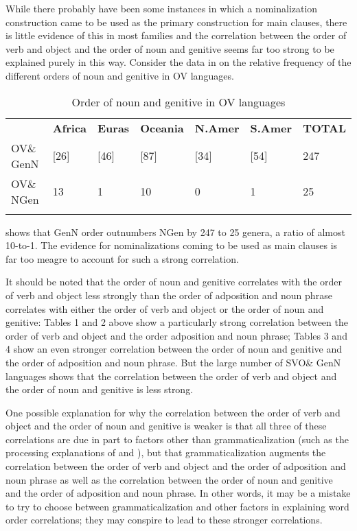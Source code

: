 \documentclass[output=paper]{langsci/langscibook}
\begin{document}
While there probably have been some instances in which a nominalization construction came to be used as the primary construction for main clauses, there is little evidence of this in most families and the correlation between the order of verb and object and the order of noun and genitive seems far too strong to be explained purely in this way. Consider the data in  on the relative frequency of the different orders of noun and genitive in OV languages.

\begin{table}
\begin{tabularx}{\textwidth}{XXXXXXX}
\lsptoprule
& \bfseries Africa & \bfseries Euras & \bfseries Oceania & \bfseries N.Amer & \bfseries S.Amer & \bfseries TOTAL\\
OV\& GenN & [26] & [46] & [87] & [34] & [54] & 247\\
OV\& NGen & 13 & 1 & 10 & 0 & 1 & 25\\
\lspbottomrule
\end{tabularx}
\caption{\label{tab:dryer:7}Order of noun and genitive in OV languages}
\end{table}

 shows that GenN order outnumbers NGen by 247 to 25 genera, a ratio of almost 10-to-1. The evidence for nominalizations coming to be used as main clauses is far too meagre to account for such a strong correlation.

It should be noted that the order of noun and genitive correlates with the order of verb and object less strongly than the order of adposition and noun phrase correlates with either the order of verb and object or the order of noun and genitive: Tables 1 and 2 above show a particularly strong correlation between the order of verb and object and the order adposition and noun phrase; Tables 3 and 4 show an even stronger correlation between the order of noun and genitive and the order of adposition and noun phrase. But the large number of SVO\& GenN languages shows that the correlation between the order of verb and object and the order of noun and genitive is less strong.

One possible explanation for why the correlation between the order of verb and object and the order of noun and genitive is weaker is that all three of these correlations are due in part to factors other than grammaticalization (such as the processing explanations of \citealt{Dryer1992} and \citealt{Hawkins1994,Hawkins2004,Hawkins2014}), but that grammaticalization augments the correlation between the order of verb and object and the order of adposition and noun phrase as well as the correlation between the order of noun and genitive and the order of adposition and noun phrase. In other words, it may be a mistake to try to choose between grammaticalization and other factors in explaining word order correlations; they may conspire to lead to these stronger correlations.
\end{document}
